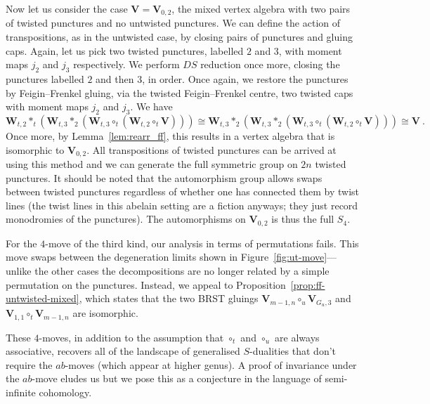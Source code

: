 \documentclass[a4paper]{article}
\def\W{\mathbf{W}}
\def\V{\mathbf{V}}
\begin{document}
Now let us consider the case $\V=\V_{0,2}$, the mixed vertex algebra with two pairs of twisted punctures and no untwisted punctures. We can define the action of transpositions, as in the untwisted case, by closing pairs of punctures and gluing caps. Again, let us pick two twisted punctures, labelled $2$ and $3$, with moment maps $j_2$ and $j_3$ respectively. We perform $DS$ reduction once more, closing the punctures labelled $2$ and then $3$, in order. Once again, we restore the punctures by Feigin--Frenkel gluing, via the twisted Feigin--Frenkel centre, two twisted caps with moment maps $j_2$ and $j_3$. We have
\begin{equation}
    \W_{t,2}\ast_t (\W_{t,3}\ast_2(\W_{t,3}\circ_t(\W_{t,2}\circ_t \V))) \cong \W_{t,3}\ast_2(\W_{t,3}\ast_2(\W_{t,3}\circ_t(\W_{t,2}\circ_t \V)))\cong \V~.
\end{equation}
Once more, by Lemma~\ref{lem:rearr_ff}, this results in a vertex algebra that is isomorphic to $\V_{0,2}$. All transpositions of twisted punctures can be arrived at using this method and we can generate the full symmetric group on $2n$ twisted punctures. It should be noted that the automorphism group allows swaps between twisted punctures regardless of whether one has connected them by twist lines (the twist lines in this abelain setting are a fiction anyways; they just record monodromies of the punctures). The automorphisms on $\V_{0,2}$ is thus the full $S_4$.

For the $4$-move of the third kind, our analysis in terms of permutations fails. This move swaps between the degeneration limits shown in Figure~\ref{fig:ut-move}---unlike the other cases the decompositions are no longer related by a simple permutation on the punctures. Instead, we appeal to Proposition~\ref{prop:ff-untwisted-mixed}, which states that the two BRST gluings $\V_{m-1,n}\circ_u\V_{G_u,3}$ and $\V_{1,1}\circ_t\V_{m-1,n}$ are isomorphic.


These $4$-moves, in addition to the assumption that $\circ_t$ and $\circ_u$ are always associative, recovers all of the landscape of generalised $S$-dualities that don't require the $ab$-moves (which appear at higher genus). A proof of invariance under the $ab$-move eludes us but we pose this as a conjecture in the language of semi-infinite cohomology.
\end{document}

